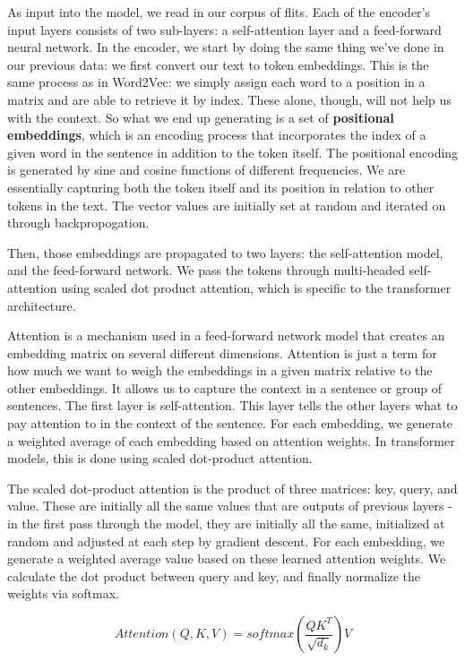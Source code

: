 \documentclass[11pt, table]{diazessay} %
\begin{document}
\begin{sloppypar}
As input into the model, we read in our corpus of flits. Each of the encoder's input layers consists of two sub-layers: a self-attention layer and a feed-forward neural network. In the encoder, we start by doing the same thing we've done in our previous data: we first convert our text to token embeddings. This is the same process as in Word2Vec: we simply assign each word to a position in a matrix and are able to retrieve it by index. These alone, though, will not help us with the context. So what we end up generating is a set of \textbf{positional embeddings}, which is an encoding process that incorporates the index of a given word in the sentence in addition to the token itself. The positional encoding is generated by sine and cosine functions of different frequencies. We are essentially capturing both the token itself and its position in relation to other tokens in the text. The vector values are initially set at random and iterated on through backpropogation. 

Then, those embeddings are propagated to two layers: the self-attention model, and the feed-forward network. We pass the tokens through multi-headed self-attention using scaled dot product attention, which is specific to the transformer architecture. 

Attention is a mechanism used in a feed-forward network model that creates an embedding matrix on several different dimensions. Attention is just a term for how much we want to weigh the embeddings in a given matrix relative to the other embeddings. It allows us to capture the context in a sentence or group of sentences. The first layer is self-attention. This layer tells the other layers what to pay attention to in the context of the sentence.  For each embedding, we generate a weighted average of each embedding based on attention weights. In transformer models, this is done using scaled dot-product attention. 

The scaled dot-product attention is  the product of three matrices: key, query, and value. These are initially all the same values that are outputs of previous layers - in the first pass through the model, they are initially all the same, initialized at random and adjusted at each step by gradient descent. For each embedding, we generate a weighted average value based on these learned attention weights. We calculate the dot product between query and key, and finally normalize the weights via softmax. 

\begin{equation}
Attention(Q, K, V) = softmax(\frac{QK^T}{\sqrt{d_k}})V
\end{equation}


\end{sloppypar}
\end{document}
